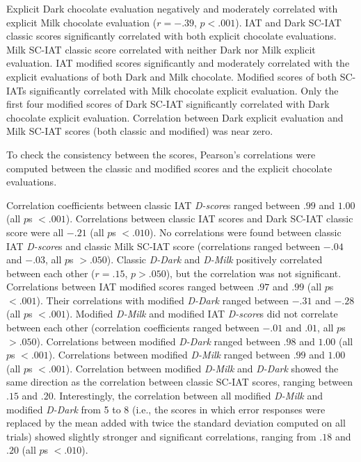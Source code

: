 \documentclass[12pt]{book}
\begin{document}
Explicit Dark chocolate evaluation negatively and moderately correlated with explicit Milk chocolate evaluation ($r = -.39$, $p < .001$). IAT and Dark SC-IAT classic scores significantly correlated with both explicit chocolate evaluations. Milk SC-IAT classic score correlated with neither Dark nor Milk explicit evaluation. IAT modified scores significantly and moderately correlated with the explicit evaluations of both Dark and Milk chocolate. Modified scores of both SC-IATs significantly correlated with Milk chocolate explicit evaluation. Only the first four modified scores of Dark SC-IAT significantly correlated with Dark chocolate explicit evaluation. Correlation between Dark explicit evaluation and Milk SC-IAT scores (both classic and modified) was near zero. 

To check the consistency between the scores, Pearson's correlations were computed between the classic and modified scores and the explicit chocolate evaluations.

Correlation coefficients between classic IAT \emph{D-score}s ranged between $.99$ and $1.00$ (all $p$s $< .001$). Correlations between classic IAT scores and Dark SC-IAT classic score were all $-.21$ (all $p$s $<.010$). No correlations were found between classic IAT \emph{D-score}s and classic Milk SC-IAT score (correlations ranged between $-.04$ and $-.03$, all $p$s $>.050$). Classic \emph{D-Dark} and \emph{D-Milk} positively correlated between each other ($r = .15$, $p > .050$), but the correlation was not significant. Correlations between IAT modified scores ranged between $.97$ and $.99$ (all $p$s $< .001$). Their correlations with modified \emph{D-Dark} ranged between $-.31$ and $-.28$ (all $p$s $<.001$). Modified \emph{D-Milk} and modified IAT \emph{D-score}s did not correlate between each other (correlation coefficients ranged between $-.01$ and $.01$, all $p$s $> .050$). Correlations between modified \emph{D-Dark} ranged between $.98$ and $1.00$ (all $p$s $<.001$). Correlations between modified \emph{D-Milk} ranged between $.99$ and $1.00$ (all $p$s $<.001$). Correlation between modified \emph{D-Milk} and \emph{D-Dark} showed the same direction as the correlation between classic SC-IAT scores, ranging between $.15$ and $.20$. Interestingly, the correlation between all modified \emph{D-Milk} and modified \emph{D-Dark} from 5 to 8 (i.e., the scores in which  error responses were replaced by the mean added with twice the standard deviation computed on all trials) showed slightly stronger and significant correlations, ranging from $.18$ and $.20$ (all $p$s $<.010$). 
\end{document}
